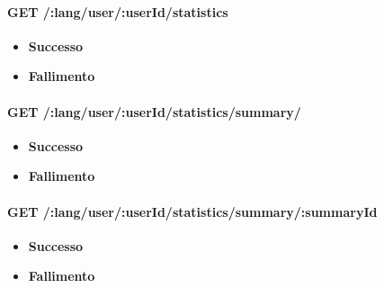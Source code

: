 \paragraph{GET /:lang/user/:userId/statistics}
\begin{itemize}
\item \textbf{Successo}
\item \textbf{Fallimento}
\end{itemize}

\paragraph{GET /:lang/user/:userId/statistics/summary/}
\begin{itemize}
\item \textbf{Successo}
\item \textbf{Fallimento}
\end{itemize}


\paragraph{GET /:lang/user/:userId/statistics/summary/:summaryId}
\begin{itemize}
\item \textbf{Successo}
\item \textbf{Fallimento}
\end{itemize}



